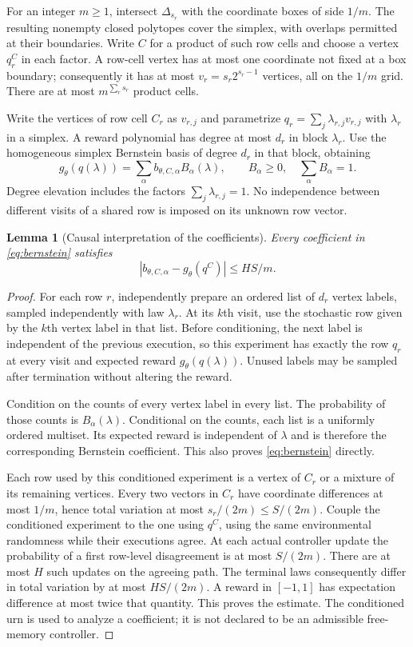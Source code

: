 \documentclass[11pt]{amsart}
\newtheorem{lemma}[theorem]{Lemma}
\theoremstyle{definition}\newtheorem{definition}[theorem]{Definition}
\theoremstyle{remark}\newtheorem{remark}[theorem]{Remark}
\newcommand{\1}{\mathbf 1}
\begin{document}
For an integer $m\ge1$, intersect $\Delta_{s_r}$ with the coordinate
boxes of side $1/m$. The resulting nonempty closed polytopes cover the
simplex, with overlaps permitted at their boundaries. Write $C$ for a
product of such row cells and choose a vertex $q^C_r$ in each factor.
A row-cell vertex has at most one coordinate not fixed at a box boundary;
consequently it has at most $v_r=s_r2^{s_r-1}$ vertices, all on the
$1/m$ grid. There are at most $m^{\sum_rs_r}$ product cells.

Write the vertices of row cell $C_r$ as $v_{r,j}$ and parametrize
$q_r=\sum_j\lambda_{r,j}v_{r,j}$ with $\lambda_r$ in a simplex.
A reward polynomial has degree at most $d_r$ in block $\lambda_r$.
Use the homogeneous simplex Bernstein basis of degree $d_r$ in that
block, obtaining
\begin{equation}\label{eq:bernstein}
 g_\theta(q(\lambda))=\sum_\alpha b_{\theta,C,\alpha}B_\alpha(\lambda),
 \qquad B_\alpha\ge0,\quad\sum_\alpha B_\alpha=1.
\end{equation}
Degree elevation includes the factors $\sum_j\lambda_{r,j}=1$.
No independence between different visits of a shared row is imposed on
its unknown row vector.

\begin{lemma}[Causal interpretation of the coefficients]\label{lem:urn}
Every coefficient in \eqref{eq:bernstein} satisfies
\[
       |b_{\theta,C,\alpha}-g_\theta(q^C)|\le HS/m.
\]
\end{lemma}
\begin{proof}
For each row $r$, independently prepare an ordered list of $d_r$ vertex
labels, sampled independently with law $\lambda_r$. At its $k$th visit,
use the stochastic row given by the $k$th vertex label in that list.
Before conditioning, the next label is independent of the previous
execution, so this experiment has exactly the row $q_r$ at every visit
and expected reward $g_\theta(q(\lambda))$. Unused labels may be sampled
after termination without altering the reward.

Condition on the counts of every vertex label in every list. The
probability of those counts is $B_\alpha(\lambda)$. Conditional on the
counts, each list is a uniformly ordered multiset. Its expected reward
is independent of $\lambda$ and is therefore the corresponding Bernstein
coefficient. This also proves \eqref{eq:bernstein} directly.

Each row used by this conditioned experiment is a vertex of $C_r$ or a
mixture of its remaining vertices. Every two vectors in $C_r$ have
coordinate differences at most $1/m$, hence total variation at most
$s_r/(2m)\le S/(2m)$. Couple the conditioned experiment to the one using
$q^C$, using the same environmental randomness while their executions
agree. At each actual controller update the probability of a first
row-level disagreement is at most $S/(2m)$. There are at most $H$ such
updates on the agreeing path. The terminal laws consequently differ in
total variation by at most $HS/(2m)$. A reward in $[-1,1]$ has expectation
difference at most twice that quantity. This proves the estimate. The
conditioned urn is used to analyze a coefficient; it is not declared to
be an admissible free-memory controller.
\end{proof}
\end{document}
